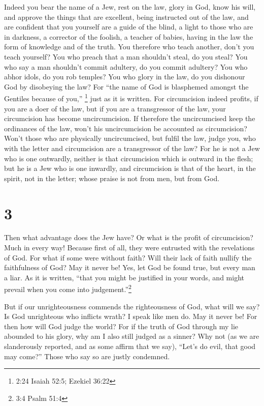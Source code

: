  Indeed you bear the name of a Jew, rest on the law, glory
in God,  know his will, and approve the things that are
excellent, being instructed out of the law,  and are
confident that you yourself are a guide of the blind, a light to those
who are in darkness,  a corrector of the foolish, a teacher
of babies, having in the law the form of knowledge and of the truth.
 You therefore who teach another, don't you teach yourself?
You who preach that a man shouldn't steal, do you steal? 
You who say a man shouldn't commit adultery, do you commit adultery? You
who abhor idols, do you rob temples?  You who glory in the
law, do you dishonour God by disobeying the law?  For ``the
name of God is blasphemed amongst the Gentiles because of you,''
\footnote{2:24 Isaiah 52:5; Ezekiel 36:22} just as it is written.
 For circumcision indeed profits, if you are a doer of the
law, but if you are a transgressor of the law, your circumcision has
become uncircumcision.  If therefore the uncircumcised keep
the ordinances of the law, won't his uncircumcision be accounted as
circumcision?  Won't those who are physically
uncircumcised, but fulfil the law, judge you, who with the letter and
circumcision are a transgressor of the law?  For he is not
a Jew who is one outwardly, neither is that circumcision which is
outward in the flesh;  but he is a Jew who is one inwardly,
and circumcision is that of the heart, in the spirit, not in the letter;
whose praise is not from men, but from God.

\hypertarget{section-2}{%
\section{3}\label{section-2}}

 Then what advantage does the Jew have? Or what is the
profit of circumcision?  Much in every way! Because first of
all, they were entrusted with the revelations of God.  For
what if some were without faith? Will their lack of faith nullify the
faithfulness of God?  May it never be! Yes, let God be found
true, but every man a liar. As it is written, ``that you might be
justified in your words, and might prevail when you come into
judgement.''\footnote{3:4 Psalm 51:4}

 But if our unrighteousness commends the righteousness of
God, what will we say? Is God unrighteous who inflicts wrath? I speak
like men do.  May it never be! For then how will God judge
the world?  For if the truth of God through my lie abounded
to his glory, why am I also still judged as a sinner?  Why
not (as we are slanderously reported, and as some affirm that we say),
``Let's do evil, that good may come?'' Those who say so are justly
condemned.

